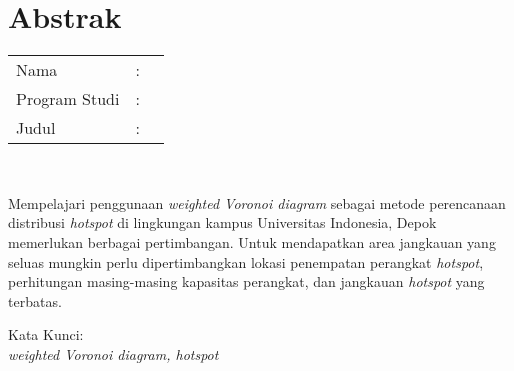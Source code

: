 %
%
%

\chapter*{Abstrak}

\vspace*{0.2cm}

\noindent \begin{tabular}{l l p{10cm}}
	Nama&: & \penulis \\
	Program Studi&: & \program \\
	Judul&: & \judul \\
\end{tabular} \\ 

\vspace*{0.5cm}

\noindent 
Mempelajari penggunaan \textit{weighted Voronoi diagram} sebagai metode perencanaan distribusi \textit{hotspot} di lingkungan kampus Universitas Indonesia, Depok memerlukan berbagai pertimbangan. Untuk mendapatkan area jangkauan yang seluas mungkin perlu dipertimbangkan lokasi penempatan perangkat \textit{hotspot}, perhitungan masing-masing kapasitas perangkat, dan jangkauan \textit{hotspot} yang terbatas.

\vspace*{0.2cm}

\noindent Kata Kunci: \\ 
\noindent  
\textit{weighted Voronoi diagram, hotspot}\\ 

\newpage